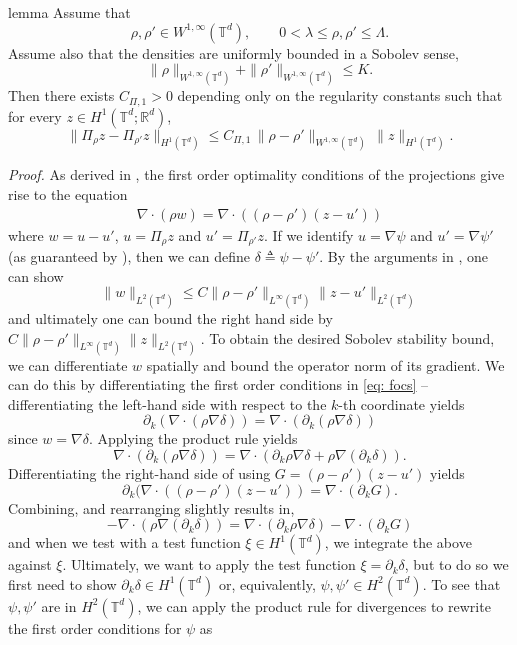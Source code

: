\documentclass[11pt]{article}
\begin{document}
\begin{restatable}{lemma}{} \label{sobolev lipschitz stability}
Assume that
\[
\rho,\rho' \in W^{1,\infty}(\mathbb{T}^d),\qquad
0<\lambda\le \rho,\rho' \le \Lambda.
\]
Assume also that the densities are uniformly bounded in a Sobolev sense,
\[\|\rho\|_{W^{1, \infty}(\mathbb{T}^d)} + \|\rho'\|_{W^{1, \infty}(\mathbb{T}^d)} \leq K.\]
Then there exists $C_{\Pi, 1}>0$ depending only on the regularity constants such that
for every $z\in H^1(\mathbb{T}^d;\mathbb R^d)$,
\[
\|\Pi_\rho z-\Pi_{\rho'} z\|_{H^1(\mathbb{T}^d)}
\le
C_{\Pi, 1}\,\|\rho-\rho'\|_{W^{1,\infty}(\mathbb{T}^d)}\,\|z\|_{H^1(\mathbb{T}^d)}.
\]
\end{restatable}
\noindent \textit{Proof.} As derived in , the first order optimality conditions of the projections give rise to the equation
\begin{align}
    \nabla \cdot (\rho w) = \nabla \cdot ((\rho - \rho')(z-u')) \label{eq: focs}
\end{align}
where $w = u - u'$, $u = \Pi_\rho z$ and $u' = \Pi_{\rho'}z$. If we identify $u = \nabla\psi$ and $u'=\nabla \psi'$ (as guaranteed by ), then we can define $\delta \triangleq \psi - \psi'$. By the arguments in , one can show
\[\|w\|_{L^2(\mathbb{T}^d)} \leq C\|\rho - \rho'\|_{L^\infty(\mathbb{T}^d)}\|z - u'\|_{L^2(\mathbb{T}^d)}\]
and ultimately one can bound the right hand side by $C\|\rho - \rho'\|_{L^\infty(\mathbb{T}^d)}\|z\|_{L^2(\mathbb{T}^d)}.$ To obtain the desired Sobolev stability bound, we can differentiate $w$ spatially and bound the operator norm of its gradient. We can do this by differentiating the first order conditions in \cref{eq: focs} -- differentiating the left-hand side with respect to the $k$-th coordinate yields
\[ \partial_k (\nabla \cdot(\rho \nabla\delta)) = \nabla \cdot(\partial_k(\rho\nabla \delta))\]
since $w = \nabla \delta$. Applying the product rule yields
\[ \nabla \cdot(\partial_k(\rho\nabla \delta)) = \nabla \cdot(\partial_k\rho\nabla \delta + \rho \nabla (\partial_k\delta)).\]
Differentiating the right-hand side of  using $G = (\rho - \rho')(z - u')$ yields
\[\partial_k(\nabla\cdot ((\rho - \rho')(z - u')) = \nabla \cdot (\partial_kG).\]
Combining, and rearranging slightly results in,
\[-\nabla \cdot( \rho\nabla (\partial_k\delta)) = \nabla \cdot (\partial_k\rho\nabla \delta) - \nabla \cdot (\partial_kG)\]
and when we test with a test function $\xi \in H^1(\mathbb{T}^d)$, we integrate the above against $\xi$. Ultimately, we want to apply the test function $\xi = \partial_k \delta$, but to do so we first need to show $\partial_k \delta \in H^1(\mathbb{T}^d)$ or, equivalently, $\psi, \psi' \in H^2(\mathbb{T}^d)$. To see that $\psi, \psi'$ are in $H^2(\mathbb{T}^d)$, we can apply the product rule for divergences to rewrite the first order conditions for $\psi$ as
\end{document}
